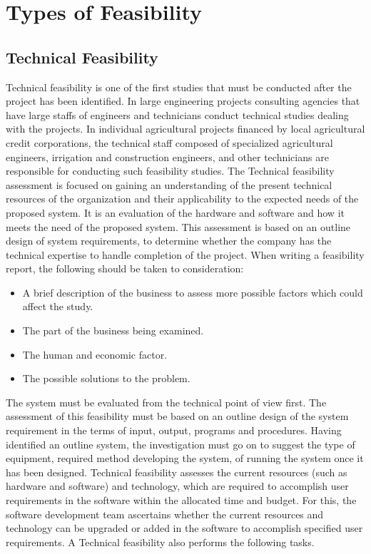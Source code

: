 \section{Types of Feasibility}

\subsection{Technical Feasibility}
Technical feasibility is one of the first studies that must be conducted after the project has been identified. In large engineering projects consulting agencies that have large staffs of engineers and technicians conduct technical studies dealing with the projects. In individual agricultural projects financed by local agricultural credit corporations, the technical staff composed of specialized agricultural engineers, irrigation and construction engineers, and other technicians are responsible for conducting such feasibility studies. The Technical feasibility assessment is focused on gaining an understanding of the present technical resources of the organization and their applicability to the expected needs of the proposed system. It is an evaluation of the hardware and software and how it meets the need of the proposed system. This assessment is based on an outline design of system requirements, to determine whether the company has the technical expertise to handle completion of the project. When writing a feasibility report, the following should be taken to consideration:
\begin{itemize}
	\item A brief description of the business to assess more possible factors which could affect the study.
	\item The part of the business being examined.
	\item The human and economic factor.
	\item The possible solutions to the problem.
\end{itemize}

The system must be evaluated from the technical point of view first. The assessment of this feasibility must be based on an outline design of the system requirement in the terms of input, output, programs and procedures. Having identified an outline system, the investigation must go on to suggest the type of equipment, required method developing the system, of running the system once it has been designed. Technical feasibility assesses the current resources (such as hardware and software) and technology, which are required to accomplish user requirements in the software within the allocated time and budget. For this, the software development team ascertains whether the current resources and technology can be upgraded or added in the software to accomplish specified user requirements. A Technical feasibility also performs the following tasks.


